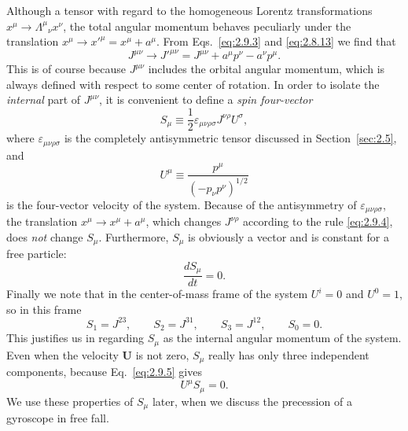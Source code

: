 Although a tensor with regard to the homogeneous Lorentz transformations
\(x^\mu\to\Lambda^\mu{}_\nu x^\nu\), the total angular momentum behaves
peculiarly under the translation \(x^\mu\to x'^\mu=x^\mu+a^\mu\). From
Eqs.~\eqref{eq:2.9.3} and \eqref{eq:2.8.13} we find that
\begin{equation}
  J^{\mu\nu}\longrightarrow J'^{\mu\nu}
  =J^{\mu\nu}+a^\mu p^\nu-a^\nu p^\mu .
  \tag{2.9.4}\label{eq:2.9.4}
\end{equation}
This is of course because \(J^{\mu\nu}\) includes the orbital angular momentum,
which is always defined with respect to some center of rotation. In order to
isolate the \emph{internal} part of \(J^{\mu\nu}\), it is convenient to define
a \emph{spin four-vector}
\begin{equation}
  S_\mu\equiv\frac12\varepsilon_{\mu\nu\rho\sigma}
  J^{\nu\rho}U^\sigma ,
  \tag{2.9.5}\label{eq:2.9.5}
\end{equation}
where \(\varepsilon_{\mu\nu\rho\sigma}\) is the completely antisymmetric tensor
discussed in Section~\ref{sec:2.5}, and
\[
  U^\mu\equiv\frac{p^\mu}{(-p_\nu p^\nu)^{1/2}}
\]
is the four-vector velocity of the system. Because of the antisymmetry of
\(\varepsilon_{\mu\nu\rho\sigma}\), the translation
\(x^\mu\to x^\mu+a^\mu\), which changes \(J^{\nu\rho}\) according to the
rule \eqref{eq:2.9.4}, does \emph{not} change \(S_\mu\). Furthermore,
\(S_\mu\) is obviously a vector and is constant for a free particle:
\begin{equation}
  \frac{dS_\mu}{dt}=0 .
  \tag{2.9.6}\label{eq:2.9.6}
\end{equation}
Finally we note that in the center-of-mass frame of the system
\(U^i=0\) and \(U^0=1\), so in this frame
\begin{equation}
  S_1=J^{23},\qquad S_2=J^{31},\qquad
  S_3=J^{12},\qquad S_0=0 .
  \tag{2.9.7}\label{eq:2.9.7}
\end{equation}
This justifies us in regarding \(S_\mu\) as the internal angular momentum of
the system. Even when the velocity \(\mathbf U\) is not zero, \(S_\mu\) really
has only three independent components, because Eq.~\eqref{eq:2.9.5} gives
\begin{equation}
  U^\mu S_\mu=0 .
  \tag{2.9.8}\label{eq:2.9.8}
\end{equation}
We use these properties of \(S_\mu\) later, when we discuss the precession of
a gyroscope in free fall.
